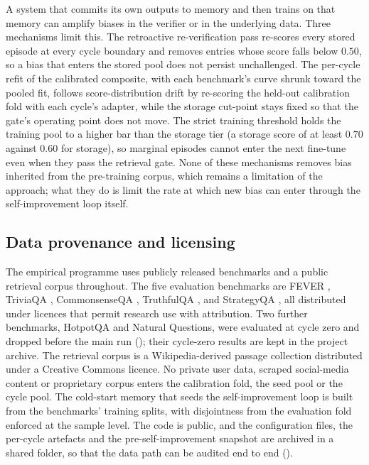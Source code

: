 A system that commits its own outputs to memory and then trains on that memory can amplify biases in the verifier or in the underlying data. Three mechanisms limit this. The retroactive re-verification pass re-scores every stored episode at every cycle boundary and removes entries whose score falls below $0.50$, so a bias that enters the stored pool does not persist unchallenged. The per-cycle refit of the calibrated composite, with each benchmark's curve shrunk toward the pooled fit, follows score-distribution drift by re-scoring the held-out calibration fold with each cycle's adapter, while the storage cut-point stays fixed so that the gate's operating point does not move. The strict training threshold holds the training pool to a higher bar than the storage tier (a storage score of at least $0.70$ against $0.60$ for storage), so marginal episodes cannot enter the next fine-tune even when they pass the retrieval gate. None of these mechanisms removes bias inherited from the pre-training corpus, which remains a limitation of the approach; what they do is limit the rate at which new bias can enter through the self-improvement loop itself.

\subsection{Data provenance and licensing}
\label{sec:ethics-provenance}

The empirical programme uses publicly released benchmarks and a public retrieval corpus throughout. The five evaluation benchmarks are FEVER \cite{thorne-etal-2018-fever}, TriviaQA \cite{joshi-etal-2017-triviaqa}, CommonsenseQA \cite{talmor-etal-2019-commonsenseqa}, TruthfulQA \cite{lin-etal-2022-truthfulqa}, and StrategyQA \cite{10.1162/tacl_a_00370}, all distributed under licences that permit research use with attribution. Two further benchmarks, HotpotQA and Natural Questions, were evaluated at cycle zero and dropped before the main run (); their cycle-zero results are kept in the project archive. The retrieval corpus is a Wikipedia-derived passage collection distributed under a Creative Commons licence. No private user data, scraped social-media content or proprietary corpus enters the calibration fold, the seed pool or the cycle pool. The cold-start memory that seeds the self-improvement loop is built from the benchmarks' training splits, with disjointness from the evaluation fold enforced at the sample level. The code is public, and the configuration files, the per-cycle artefacts and the pre-self-improvement snapshot are archived in a shared folder, so that the data path can be audited end to end ().

